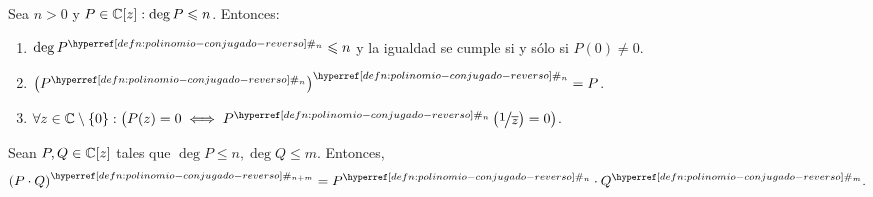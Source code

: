 \begin{lem}\label{lem:polinomio-conjugado-reverso}
    Sea $n > 0$ y $P \in \mathbb{C}[z] : \deg P \leqslant n$. Entonces:
    \begin{enumerate}[label=\textnormal{(\arabic*)}]
        \item $\deg{P^{\exhyperref[defn:polinomio-conjugado-reverso]{polinomio-conjugado-reverso}{\#_n}}} \leq n$ y la igualdad se cumple si y sólo si $P(0) \neq 0$.
        \item $\left(P^{\exhyperref[defn:polinomio-conjugado-reverso]{polinomio-conjugado-reverso}{\#_n}}\right)^{\exhyperref[defn:polinomio-conjugado-reverso]{polinomio-conjugado-reverso}{\#_n}} = P$.
        \item $\forall z \in \C \setminus \{0\} : \big(P(z) = 0 \iff P^{\exhyperref[defn:polinomio-conjugado-reverso]{polinomio-conjugado-reverso}{\#_n}} \left(\sfrac{1}{\bar{z}}\right) = 0\big)$.
    \end{enumerate}
\end{lem}

\begin{prop}\label{prop:conjugado-reverso-producto}
    Sean $P, Q \in \mathbb{C}[z]$ tales que $\deg P \leq n, \deg Q \leq m$. Entonces,
    \[
    \left(P \cdot Q\right)^{\exhyperref[defn:polinomio-conjugado-reverso]{polinomio-conjugado-reverso}{\#_{n+m}}} = P^{\exhyperref[defn:polinomio-conjugado-reverso]{polinomio-conjugado-reverso}{\#_n}} \cdot Q^{\exhyperref[defn:polinomio-conjugado-reverso]{polinomio-conjugado-reverso}{\#_m}}.
    \]
\end{prop}

